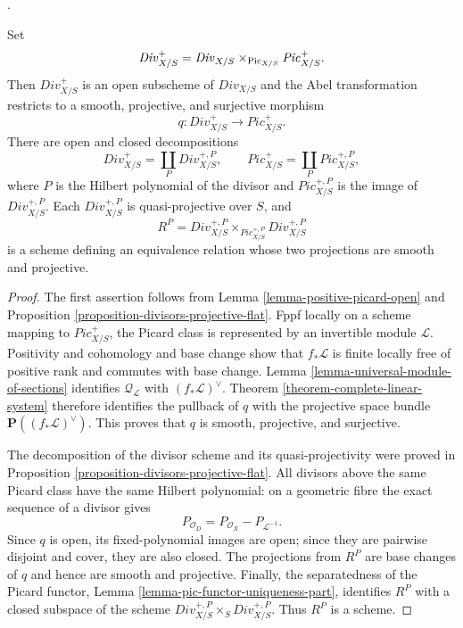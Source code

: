 \begin{lemma}
\label{lemma-positive-divisor-cover}
\begin{reference}
\cite[Expos\'e 232, Section 5, pp. 154--155]{FGA}.
\end{reference}
Set
$$
\mathit{Div}^+_{X/S} =
\mathit{Div}_{X/S} \times_{\mathrm{Pic}_{X/S}}
\mathit{Pic}^+_{X/S}.
$$
Then $\mathit{Div}^+_{X/S}$ is an open subscheme of
$\mathit{Div}_{X/S}$ and the Abel transformation restricts to a smooth,
projective, and surjective morphism
\begin{equation}
\label{equation-positive-divisors-to-positive-picard}
q : \mathit{Div}^+_{X/S} \longrightarrow \mathit{Pic}^+_{X/S}.
\end{equation}
There are open and closed decompositions
$$
\mathit{Div}^+_{X/S} = \coprod_P \mathit{Div}^{+,P}_{X/S},
\qquad
\mathit{Pic}^+_{X/S} = \coprod_P \mathit{Pic}^{+,P}_{X/S},
$$
where $P$ is the Hilbert polynomial of the divisor and
$\mathit{Pic}^{+,P}_{X/S}$ is the image of
$\mathit{Div}^{+,P}_{X/S}$. Each $\mathit{Div}^{+,P}_{X/S}$ is
quasi-projective over $S$, and
$$
R^P = \mathit{Div}^{+,P}_{X/S}
\times_{\mathit{Pic}^{+,P}_{X/S}}
\mathit{Div}^{+,P}_{X/S}
$$
is a scheme defining an equivalence relation whose two projections are
smooth and projective.
\end{lemma}

\begin{proof}
The first assertion follows from Lemma \ref{lemma-positive-picard-open} and
Proposition \ref{proposition-divisors-projective-flat}. Fppf locally on a
scheme mapping to $\mathit{Pic}^+_{X/S}$, the Picard class is represented by
an invertible module $\mathcal{L}$. Positivity and cohomology and base change
show that $f_*\mathcal{L}$ is finite locally free of positive rank and
commutes with base change. Lemma
\ref{lemma-universal-module-of-sections} identifies
$\mathcal{Q}_{\mathcal{L}}$ with $(f_*\mathcal{L})^\vee$. Theorem
\ref{theorem-complete-linear-system} therefore identifies the pullback of
$q$ with the projective space bundle
$\mathbf{P}((f_*\mathcal{L})^\vee)$. This proves that $q$ is smooth,
projective, and surjective.

The decomposition of the divisor scheme and its quasi-projectivity were
proved in Proposition \ref{proposition-divisors-projective-flat}. All
divisors above the same Picard class have the same Hilbert polynomial: on a
geometric fibre the exact sequence of a divisor gives
$$
P_{\mathcal{O}_D} =
P_{\mathcal{O}_X} - P_{\mathcal{L}^{-1}}.
$$
Since $q$ is open, its fixed-polynomial images are open; since they are
pairwise disjoint and cover, they are also closed. The projections from
$R^P$ are base changes of $q$ and hence are smooth and projective. Finally,
the separatedness of the Picard functor, Lemma
\ref{lemma-pic-functor-uniqueness-part}, identifies $R^P$ with a closed
subspace of the scheme
$\mathit{Div}^{+,P}_{X/S} \times_S \mathit{Div}^{+,P}_{X/S}$.
Thus $R^P$ is a scheme.
\end{proof}

